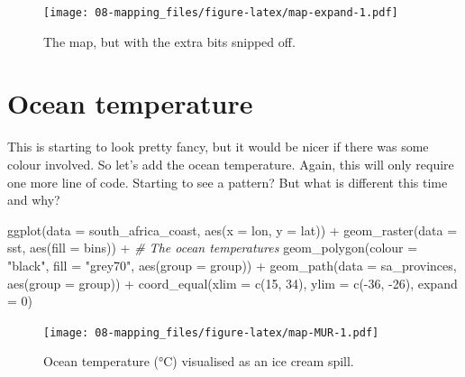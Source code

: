 \documentclass[
]{book}
\newenvironment{Shaded}{\begin{snugshade}}{\end{snugshade}}
\newcommand{\AttributeTok}[1]{\textcolor[rgb]{0.77,0.63,0.00}{#1}}
\newcommand{\CommentTok}[1]{\textcolor[rgb]{0.56,0.35,0.01}{\textit{#1}}}
\newcommand{\DecValTok}[1]{\textcolor[rgb]{0.00,0.00,0.81}{#1}}
\newcommand{\FunctionTok}[1]{\textcolor[rgb]{0.00,0.00,0.00}{#1}}
\newcommand{\NormalTok}[1]{#1}
\newcommand{\SpecialCharTok}[1]{\textcolor[rgb]{0.00,0.00,0.00}{#1}}
\newcommand{\StringTok}[1]{\textcolor[rgb]{0.31,0.60,0.02}{#1}}
\begin{document}
\begin{figure}
\centering
\texttt{[image: 08-mapping\_files/figure-latex/map-expand-1.pdf]}
\caption{\label{fig:map-expand}The map, but with the extra bits snipped off.}
\end{figure}

\hypertarget{ocean-temperature}{%
\section{Ocean temperature}\label{ocean-temperature}}

This is starting to look pretty fancy, but it would be nicer if there was some colour involved. So let's add the ocean temperature. Again, this will only require one more line of code. Starting to see a pattern? But what is different this time and why?

\begin{Shaded}
\begin{Highlighting}[]
\FunctionTok{ggplot}\NormalTok{(}\AttributeTok{data =}\NormalTok{ south\_africa\_coast, }\FunctionTok{aes}\NormalTok{(}\AttributeTok{x =}\NormalTok{ lon, }\AttributeTok{y =}\NormalTok{ lat)) }\SpecialCharTok{+}
  \FunctionTok{geom\_raster}\NormalTok{(}\AttributeTok{data =}\NormalTok{ sst, }\FunctionTok{aes}\NormalTok{(}\AttributeTok{fill =}\NormalTok{ bins)) }\SpecialCharTok{+} \CommentTok{\# The ocean temperatures}
  \FunctionTok{geom\_polygon}\NormalTok{(}\AttributeTok{colour =} \StringTok{"black"}\NormalTok{, }\AttributeTok{fill =} \StringTok{"grey70"}\NormalTok{, }\FunctionTok{aes}\NormalTok{(}\AttributeTok{group =}\NormalTok{ group)) }\SpecialCharTok{+}
  \FunctionTok{geom\_path}\NormalTok{(}\AttributeTok{data =}\NormalTok{ sa\_provinces, }\FunctionTok{aes}\NormalTok{(}\AttributeTok{group =}\NormalTok{ group)) }\SpecialCharTok{+}
  \FunctionTok{coord\_equal}\NormalTok{(}\AttributeTok{xlim =} \FunctionTok{c}\NormalTok{(}\DecValTok{15}\NormalTok{, }\DecValTok{34}\NormalTok{), }\AttributeTok{ylim =} \FunctionTok{c}\NormalTok{(}\SpecialCharTok{{-}}\DecValTok{36}\NormalTok{, }\SpecialCharTok{{-}}\DecValTok{26}\NormalTok{), }\AttributeTok{expand =} \DecValTok{0}\NormalTok{)}
\end{Highlighting}
\end{Shaded}

\begin{figure}
\centering
\texttt{[image: 08-mapping\_files/figure-latex/map-MUR-1.pdf]}
\caption{\label{fig:map-MUR}Ocean temperature (°C) visualised as an ice cream spill.}
\end{figure}
\end{document}
